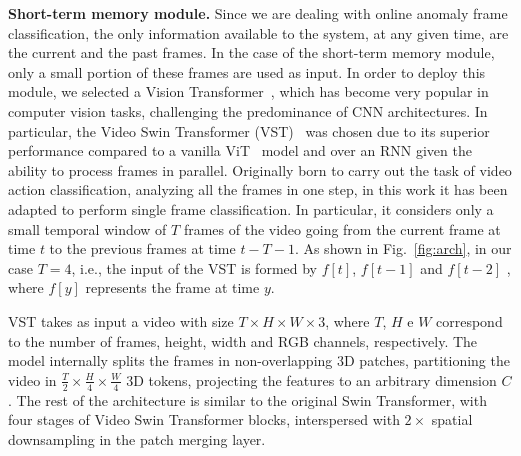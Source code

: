 \noindent\textbf{Short-term memory module.}
Since we are dealing with online anomaly frame classification, the only information available to the system, at any given time, are the current and the past frames.
In the case of the short-term memory module, only a small portion of these frames are used as input.
In order to deploy this module, we selected a Vision Transformer~\cite{DBLP:conf/iclr/DosovitskiyB0WZ21}, which has become very popular in computer vision tasks, challenging the predominance of CNN architectures. 
In particular, the Video Swin Transformer (VST)~\cite{liu_video_2022} was chosen due to its superior performance compared to a vanilla ViT~\cite{DBLP:conf/iclr/DosovitskiyB0WZ21} model
and over an RNN  given the ability to process frames in parallel.
Originally born to carry out the task of video action classification, analyzing all the frames in one step, in this work it has been adapted to perform single frame classification.
In particular, it considers only a small temporal window of $T$ frames of the video going from the current frame at time $t$ to the previous frames at time $t-T-1$.
As shown in Fig.~\ref{fig:arch}, in our case $T=4$, i.e., the input of the VST is formed by $f[t]$, $f[t-1]$ and $f[t-2]$ , where $f[y]$ represents the frame at time $y$.

VST takes as input a video with size $T \times H \times W \times 3$, where $T$, $H$ e $W$ correspond to the number of frames, height, width and RGB channels, respectively.
The model internally splits the frames in non-overlapping 3D patches, partitioning the video in $\frac{T}{2} \times \frac{H}{4} \times \frac{W}{4}$ 3D tokens, projecting the features to an arbitrary dimension $C$.
The rest of the architecture is similar to the original Swin Transformer, with four stages of Video Swin Transformer blocks, 
interspersed with $2\times$ spatial downsampling in the patch merging layer.

